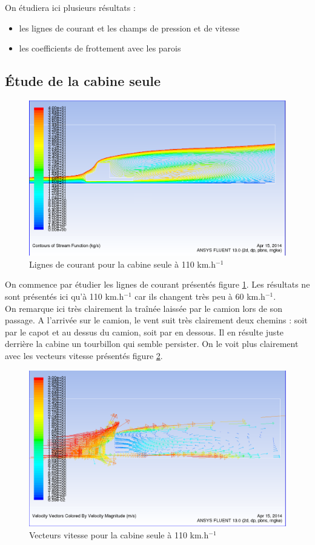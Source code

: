 \bigskip
On étudiera ici plusieurs résultats :
\begin{itemize}
	\item les lignes de courant et les champs de pression et de vitesse
	\item les coefficients de frottement avec les parois
\end{itemize}

\subsection{Étude de la cabine seule}
\begin{figure}[!h]
\centering
\includegraphics[scale=0.4]{resultsCx/camion110_stream.png}
\caption{Lignes de courant pour la cabine seule à 110 km.h$^{-1}$}
\label{figCabStream110}
\end{figure}
On commence par étudier les lignes de courant présentés figure \ref{figCabStream110}. Les résultats ne sont présentés ici qu'à 110 km.h$^{-1}$ car ils changent très peu à 60 km.h$^{-1}$. \\
On remarque ici très clairement la traînée laissée par le camion lors de son passage. A l'arrivée sur le camion, le vent suit très clairement deux chemins : soit par le capot et au dessus du camion, soit par en dessous. Il en résulte juste derrière la cabine un tourbillon qui semble persister. On le voit plus clairement avec les vecteurs vitesse présentés figure \ref{figCabVit110}.

\begin{figure}[!h]
\centering
\includegraphics[scale=0.4]{resultsCx/camion110_velocityVectors.png}
\caption{Vecteurs vitesse pour la cabine seule à 110 km.h$^{-1}$}
\label{figCabVit110}
\end{figure}
\clearpage

